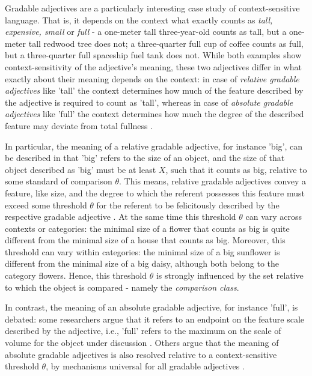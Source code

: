 Gradable adjectives are a particularly interesting case study of context-sensitive language. That is, it depends on the context what exactly counts as \textit{tall, expensive, small} or \textit{full} - a one-meter tall three-year-old counts as tall, but a one-meter tall redwood tree does not; a three-quarter full cup of coffee counts as full, but a three-quarter full spaceship fuel tank does not. While both examples show context-sensitivity of the adjective's meaning, these two adjectives differ in what exactly about their meaning depends on the context: in case of \textit{relative gradable adjectives} like 'tall' the context determines how much of the feature described by the adjective is required to count as 'tall', whereas in case of \textit{absolute gradable adjectives} like 'full' the context determines how much the degree of the described feature may deviate from total fullness \parencite{Aparicio2016, Kennedy2007, hofherr2010adjectives}.  

In particular, the meaning of a relative gradable adjective, for instance 'big', can be described in that 'big' refers to the size of an object, and the size of that object  described as 'big' must be at least $X$, such that it counts as big, relative to some standard of comparison $\theta$. This means, relative gradable adjectives convey a feature, like size, and the degree to which the referent possesses this feature must exceed some threshold $\theta$ for the referent to be felicitously described by the respective gradable adjective \parencite[e.g.,][]{Kennedy2007}. At the same time this threshold $\theta$ can vary across contexts or categories: the minimal size of a flower that counts as big is quite different from the minimal size of a house that counts as big. Moreover, this threshold can vary within categories: the minimal size of a big sunflower is different from the minimal size of a big daisy, although both belong to the category flowers. Hence, this threshold $\theta$ is strongly influenced by the set relative to which the object is compared - namely the \textit{comparison class}.

In contrast, the meaning of an absolute gradable adjective, for instance 'full', is debated: some researchers argue that it refers to an endpoint on the feature scale described by the adjective, i.e., 'full' refers to the maximum on the scale of volume for the object under discussion \parencite{Kennedy2007, Aparicio2016, Qing2014}. Others argue that the meaning of absolute gradable adjectives is also resolved relative to a context-sensitive threshold $\theta$, by mechanisms universal for all gradable adjectives \parencite{lassiter2017adjectival}.

